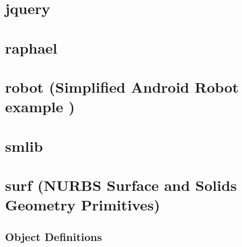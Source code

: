 \documentclass [11pt]{book}
\begin{document}
\section{jquery }

\label{sec:jquery}







\section{raphael }

\label{sec:raphael}







\section{robot (Simplified Android Robot example )}

\label{sec:robot(simplifiedandroidrobotexample)}







\section{smlib }

\label{sec:smlib}







\section{surf (NURBS Surface and Solids Geometry Primitives)}

\label{sec:surf(nurbssurfaceandsolidsgeometryprimitives)}





\subsection{Object Definitions}

\label{subsec:objectdefinitions}
\end{document}

